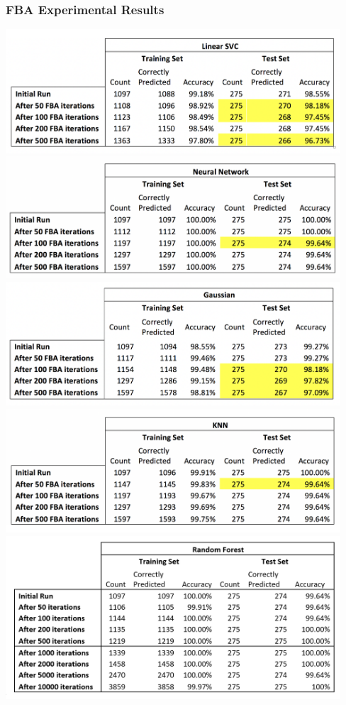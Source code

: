 \documentclass{article}
\begin{document}
\subsubsection{FBA Experimental Results}
\includegraphics[width=125mm]{linear_svc_results.png}
\includegraphics[width=125mm]{neural_network.png}
\includegraphics[width=125mm]{gaussian_results.png}
\includegraphics[width=125mm]{knn_results.png}
\includegraphics[width=125mm]{rf_results.png}
\end{document}

